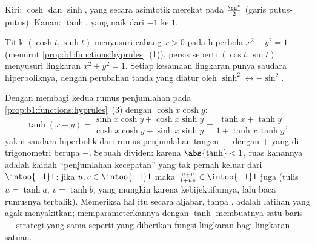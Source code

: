 \begin{omfigure}

{\small Kiri: $\cosh$ dan $\sinh$, yang secara asimtotik merekat pada
$\frac{\eu^x}{2}$ (garis putus-putus). Kanan: $\tanh$, yang naik dari $-1$ ke
$1$.}
\end{omfigure}

\begin{remark}
Titik $(\cosh t, \sinh t)$ menyusuri cabang $x > 0$ pada
hiperbola $x^2 - y^2 = 1$ (menurut
\cref{prop:b1:functions:hyprules}~(1)), persis seperti $(\cos t, \sin
t)$ menyusuri lingkaran $x^2 + y^2 = 1$. Setiap kesamaan lingkaran punya
saudara hiperboliknya, dengan perubahan tanda yang diatur oleh
$\sinh^2 \leftrightarrow -\sin^2$.
\end{remark}

\begin{example}\label{ex:b1:functions:tanhadd}
Dengan membagi kedua rumus penjumlahan pada
\cref{prop:b1:functions:hyprules}~(3) dengan $\cosh x\cosh y$:
\[
\tanh(x + y)
= \frac{\sinh x\cosh y + \cosh x\sinh y}
{\cosh x\cosh y + \sinh x\sinh y}
= \frac{\tanh x + \tanh y}{1 + \tanh x\,\tanh y} ,
\]
yakni saudara hiperbolik dari rumus penjumlahan tangen --- dengan
$+$ yang di trigonometri berupa $-$. Sebuah dividen: karena $\abs{\tanh}
< 1$, ruas kanannya adalah kaidah ``penjumlahan kecepatan'' yang
tak pernah keluar dari $\intoo{-1}1$: jika $u, v \in \intoo{-1}1$ maka
$\frac{u + v}{1 + uv} \in \intoo{-1}1$ juga (tulis $u = \tanh
a$, $v = \tanh b$, yang mungkin karena kebijektifannya, lalu baca rumusnya
terbalik). Memeriksa hal itu secara aljabar, tanpa , adalah latihan yang agak menyakitkan; memparameterkannya dengan
$\tanh$ membuatnya satu baris --- strategi yang sama seperti yang
diberikan fungsi lingkaran bagi lingkaran satuan.
\end{example}

